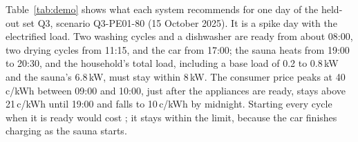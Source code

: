 \documentclass[12pt,a4paper]{report}
\begin{document}
Table~\ref{tab:demo} shows what each system recommends for one day of
the held-out set Q3, scenario Q3-PE01-80 (15 October 2025). It is a
spike day with the electrified load. Two washing cycles and a dishwasher
are ready from about 08:00, two drying cycles from 11:15, and the car
from 17:00; the sauna heats from 19:00 to 20:30, and the household's
total load, including a base load of 0.2 to 0.8\,kW and the sauna's
6.8\,kW, must stay within 8\,kW. The consumer price peaks at 40\,c/kWh
between 09:00 and 10:00, just after the appliances are ready, stays
above 21\,c/kWh until 19:00 and falls to 10\,c/kWh by midnight.
Starting every cycle when it is ready would cost ; it stays
within the limit, because the car finishes charging as the sauna
starts.
\end{document}
